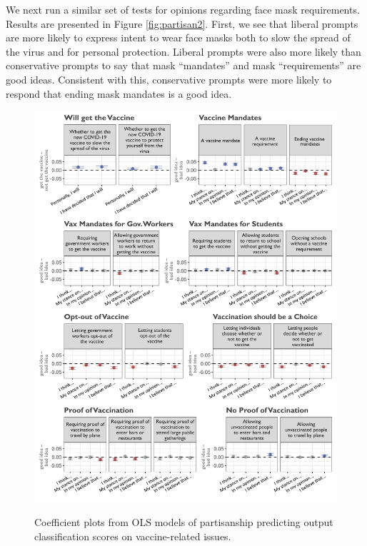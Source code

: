 \documentclass{article}
\begin{document}
We next run a similar set of tests for opinions regarding face mask
requirements. Results are presented in Figure \ref{fig:partisan2}. First, we see that
liberal prompts are more likely to express intent to wear face masks
both to slow the spread of the virus and for personal protection.
Liberal prompts were also more likely than conservative prompts to say
that mask ``mandates'' and mask ``requirements'' are good ideas.
Consistent with this, conservative prompts were more likely to respond
that ending mask mandates is a good idea.

\begin{figure}[!tp]
  \vspace{-0.5cm}
  \captionsetup{justification=raggedright,singlelinecheck=false}
  \caption{Coefficient plots from OLS models of partisanship predicting output classification scores on vaccine-related issues.}
  \centering
  \includegraphics[width=\textwidth, height=\textheight, keepaspectratio]{./figures/media/image12.png}
  \label{fig:coefplot}
\end{figure}
\end{document}
